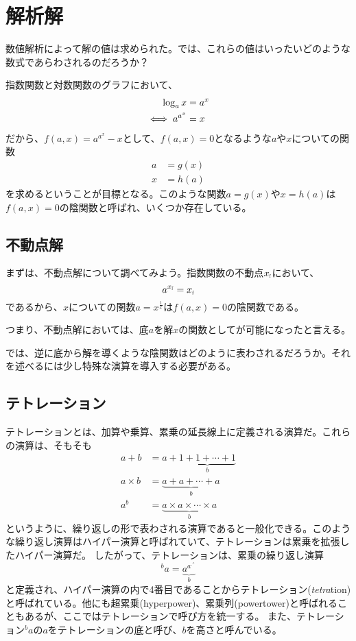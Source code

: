 \section{解析解}

	数値解析によって解の値は求められた。では、これらの値はいったいどのような数式であらわされるのだろうか？

	指数関数と対数関数のグラフにおいて、
	\begin{align*}
		\log_{a} x &= a^x \\
	\iff a^{a^x}&= x
	\end{align*}
	だから、$f(a,x) = a^{a^x} - x$として、$f(a,x) = 0$となるような$a$や$x$についての関数
	\begin{align*}
			 a &= g(x) \\
			 x &= h(a) 
	\end{align*}
	を求めるということが目標となる。このような関数$a = g(x)$や$x = h(a)$は$f(a,x) = 0$の陰関数と呼ばれ、いくつか存在している。

\subsection{不動点解}
	まずは、不動点解について調べてみよう。指数関数の不動点$\xf$において、
	\begin{equation*}
		a^{\xf} = \xf
	\end{equation*}
	であるから、$x$についての関数$a = x^{\frac{1}{x}}$は$f(a,x) = 0$の陰関数である。
	
	つまり、不動点解においては、底$a$を解$x$の関数としてが可能になったと言える。
	
	では、逆に底から解を導くような陰関数はどのように表わされるだろうか。それを述べるには少し特殊な演算を導入する必要がある。
	
\subsection{テトレーション}
	テトレーションとは、加算や乗算、累乗の延長線上に定義される演算だ。これらの演算は、そもそも
	\begin{align*}
		a + b &= a +  \underbrace{1 + 1 + \cdots + 1}_b \\
		a \times b &= \underbrace{a + a + \cdots + a}_b \\
		a^b   &= \underbrace{a \times a \times \cdots \times a}_b
	\end{align*}
	というように、繰り返しの形で表わされる演算であると一般化できる。このような繰り返し演算はハイパー演算と呼ばれていて、テトレーションは累乗を拡張したハイパー演算だ。
	したがって、テトレーションは、累乗の繰り返し演算
	\begin{equation*}
		^b a = \underbrace{a ^{a ^{\cdot ^{\cdot ^a}}}}_b
	\end{equation*}
	と定義され、ハイパー演算の内で4番目であることからテトレーション(\emph{tetra}tion)と呼ばれている。他にも超累乗(hyperpower)、累乗列(powertower)と呼ばれることもあるが、ここではテトレーションで呼び方を統一する。
	また、テトレーション$^b a$の$a$をテトレーションの底と呼び、$b$を高さと呼んでいる。
	
